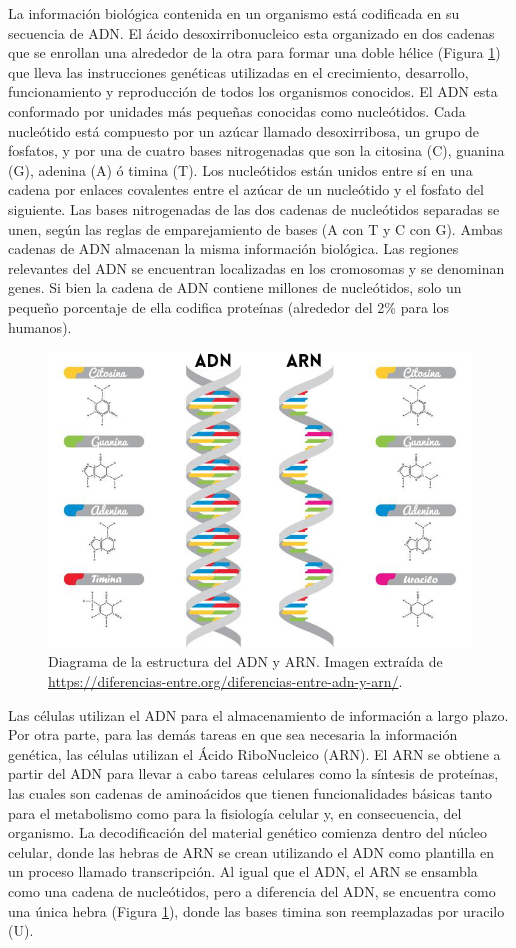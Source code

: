 \documentclass[12pt,twoside]{reedthesis}
\begin{document}
La información biológica contenida en un organismo está codificada en su secuencia de ADN. El ácido desoxirribonucleico esta organizado en dos cadenas que se enrollan una alrededor de la otra para formar una doble hélice (Figura \ref{fig:adn}) que lleva las instrucciones genéticas utilizadas en el crecimiento, desarrollo, funcionamiento y reproducción de todos los organismos conocidos. El ADN esta conformado por unidades más pequeñas conocidas como nucleótidos. Cada nucleótido está compuesto por un azúcar llamado desoxirribosa, un grupo de fosfatos, y por una de cuatro bases nitrogenadas que son la citosina (C), guanina (G), adenina (A) ó timina (T). Los nucleótidos están unidos entre sí en una cadena por enlaces covalentes entre el azúcar de un nucleótido y el fosfato del siguiente. Las bases nitrogenadas de las dos cadenas de nucleótidos separadas se unen, según las reglas de emparejamiento de bases (A con T y C con G). Ambas cadenas de ADN almacenan la misma información biológica. Las regiones relevantes del ADN se encuentran localizadas en los cromosomas y se denominan genes. Si bien la cadena de ADN contiene millones de nucleótidos, solo un pequeño porcentaje de ella codifica proteínas (alrededor del 2\% para los humanos).
\begin{figure}

{\centering \includegraphics[width=0.7\linewidth]{images/ADN_ARN} 

}

\caption{Diagrama de la estructura del ADN y ARN. Imagen extraída de \url{https://diferencias-entre.org/diferencias-entre-adn-y-arn/}.}\label{fig:adn}
\end{figure}


Las células utilizan el ADN para el almacenamiento de información a largo plazo. Por otra parte, para las demás tareas en que sea necesaria la información genética, las células utilizan el Ácido RiboNucleico (ARN). El ARN se obtiene a partir del ADN para llevar a cabo tareas celulares como la síntesis de proteínas, las cuales son cadenas de aminoácidos que tienen funcionalidades básicas tanto para el metabolismo como para la fisiología celular y, en consecuencia, del organismo. La decodificación del material genético comienza dentro del núcleo celular, donde las hebras de ARN se crean utilizando el ADN como plantilla en un proceso llamado transcripción. Al igual que el ADN, el ARN se ensambla como una cadena de nucleótidos, pero a diferencia del ADN, se encuentra como una única hebra (Figura \ref{fig:adn}), donde las bases timina son reemplazadas por uracilo (U).
\end{document}
